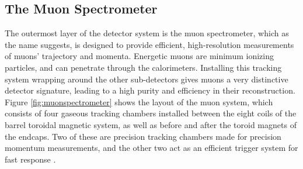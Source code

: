 

\subsection{The Muon Spectrometer}
\label{ssec:ATLASMS}
The outermost layer of the \ATLAS detector system is the muon spectrometer, which as the name suggests, is designed to provide efficient, high-resolution measurements of muons' trajectory and momenta. Energetic muons are minimum ionizing particles, and can penetrate through the calorimeters. Installing this tracking system wrapping around the other sub-detectors gives muons a very distinctive detector signature, leading to a high purity and efficiency in their reconstruction. Figure \ref{fig:muonspectrometer} shows the layout of the muon system, which consists of four gaseous tracking chambers installed between the eight coils of the barrel toroidal magnetic system, as well as before and after the toroid magnets of the endcaps. Two of these are precision tracking chambers made for precision momentum measurements, and the other two act as an efficient trigger system for fast response \cite{PALESTINI2003337}. 

